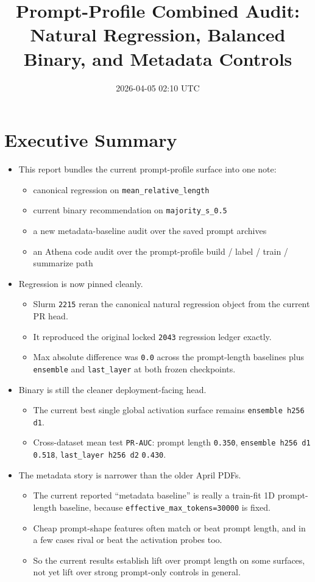 \documentclass[11pt]{article}
\title{Prompt-Profile Combined Audit:\\Natural Regression, Balanced Binary, and Metadata Controls}
\author{}
\date{2026-04-05 02:10 UTC}
\begin{document}
\maketitle

\section*{Executive Summary}
\begin{itemize}[leftmargin=1.5em]
\item This report bundles the current prompt-profile surface into one note:
  \begin{itemize}[leftmargin=1.5em]
  \item canonical regression on \texttt{mean\_relative\_length}
  \item current binary recommendation on \texttt{majority\_s\_0.5}
  \item a new metadata-baseline audit over the saved prompt archives
  \item an Athena code audit over the prompt-profile build / label / train / summarize path
  \end{itemize}
\item Regression is now pinned cleanly.
  \begin{itemize}[leftmargin=1.5em]
  \item Slurm \texttt{2215} reran the canonical natural regression object from the current PR head.
  \item It reproduced the original locked \texttt{2043} regression ledger exactly.
  \item Max absolute difference was \texttt{0.0} across the prompt-length baselines plus \texttt{ensemble} and \texttt{last\_layer} at both frozen checkpoints.
  \end{itemize}
\item Binary is still the cleaner deployment-facing head.
  \begin{itemize}[leftmargin=1.5em]
  \item The current best single global activation surface remains \texttt{ensemble h256 d1}.
  \item Cross-dataset mean test \texttt{PR-AUC}: prompt length \texttt{0.350}, \texttt{ensemble h256 d1} \texttt{0.518}, \texttt{last\_layer h256 d2} \texttt{0.430}.
  \end{itemize}
\item The metadata story is narrower than the older April PDFs.
  \begin{itemize}[leftmargin=1.5em]
  \item The current reported ``metadata baseline'' is really a train-fit 1D prompt-length baseline, because \texttt{effective\_max\_tokens=30000} is fixed.
  \item Cheap prompt-shape features often match or beat prompt length, and in a few cases rival or beat the activation probes too.
  \item So the current results establish lift over prompt length on some surfaces, not yet lift over strong prompt-only controls in general.
  \end{itemize}
\end{itemize}
\end{document}
